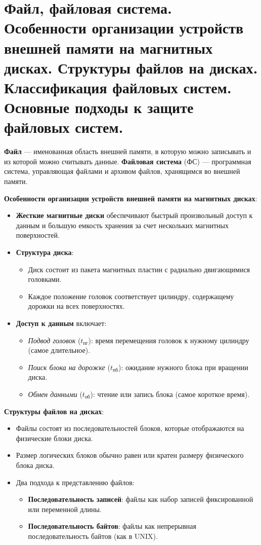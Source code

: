 \documentclass[a4paper,12pt]{article}
\begin{document}
\section{Файл, файловая система. Особенности организации устройств внешней памяти на магнитных дисках. Структуры файлов на дисках. Классификация файловых систем. Основные подходы к защите файловых систем.}

\textbf{Файл} — именованная область внешней памяти, в которую можно записывать и из которой можно считывать данные. \textbf{Файловая система} (ФС) — программная система, управляющая файлами и архивом файлов, хранящимся во внешней памяти.

\textbf{Особенности организации устройств внешней памяти на магнитных дисках}:

\begin{itemize}
    \item \textbf{Жесткие магнитные диски} обеспечивают быстрый произвольный доступ к данным и большую емкость хранения за счет нескольких магнитных поверхностей.
    \item \textbf{Структура диска}:
    \begin{itemize}
        \item Диск состоит из пакета магнитных пластин с радиально двигающимися головками.
        \item Каждое положение головок соответствует цилиндру, содержащему дорожки на всех поверхностях.
    \end{itemize}
    \item \textbf{Доступ к данным} включает:
    \begin{itemize}
        \item \textit{Подвод головок} ($t_{\text{пг}}$): время перемещения головок к нужному цилиндру (самое длительное).
        \item \textit{Поиск блока на дорожке} ($t_{\text{пб}}$): ожидание нужного блока при вращении диска.
        \item \textit{Обмен данными} ($t_{\text{об}}$): чтение или запись блока (самое короткое время).
    \end{itemize}
\end{itemize}

\textbf{Структуры файлов на дисках}:

\begin{itemize}
    \item Файлы состоят из последовательностей блоков, которые отображаются на физические блоки диска.
    \item Размер логических блоков обычно равен или кратен размеру физического блока диска.
    \item Два подхода к представлению файлов:
    \begin{itemize}
        \item \textbf{Последовательность записей}: файлы как набор записей фиксированной или переменной длины.
        \item \textbf{Последовательность байтов}: файлы как непрерывная последовательность байтов (как в UNIX).
    \end{itemize}
\end{itemize}
\end{document}
